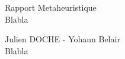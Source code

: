 \begin{center}
  \Huge Rapport Metaheuristique\\
  \LARGE
  Blabla\\


  \vspace{50mm}


  \vspace{70mm}

  \Huge Julien DOCHE - Yohann Belair\\

  \Large Blabla\\



\end{center}

\newpage

